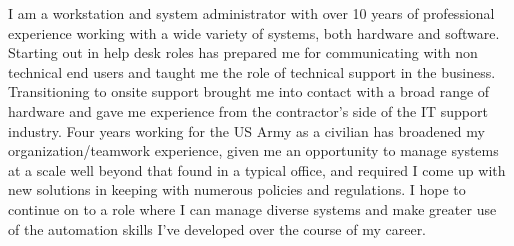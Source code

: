 \documentclass[..\main.tex]{subfiles}
\begin{document}
I am a workstation and system administrator with over 10 years of professional experience working with a wide variety of systems, both hardware and software. Starting out in help desk roles has prepared me for communicating with non technical end users and taught me the role of technical support in the business. Transitioning to onsite support brought me into contact with a broad range of hardware and gave me experience from the contractor's side of the IT support industry. Four years working for the US Army as a civilian has broadened my organization/teamwork experience, given me an opportunity to manage systems at a scale well beyond that found in a typical office, and required I come up with new solutions in keeping with numerous policies and regulations. I hope to continue on to a role where I can manage diverse systems and make greater use of the automation skills I've developed over the course of my career. 
\end{document}
